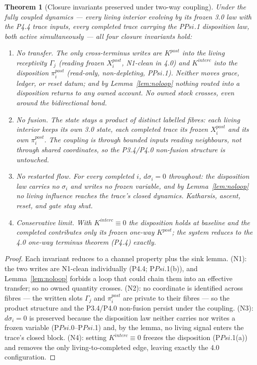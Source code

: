 \documentclass[11pt,a4paper]{article}
\def\Psi{Psi}%
\def\mathrm#1{#1}%
\def\emph#1{#1}%
\theoremstyle{definition}
\theoremstyle{plain}
\newtheorem{theorem}[definition]{Theorem}
\theoremstyle{remark}
\begin{document}
\begin{theorem}[Closure invariants preserved under two-way coupling]\label{thm:psipreserve}
Under the fully coupled dynamics --- every living interior evolving by its frozen 3.0 law with
the P4.4 trace inputs, every completed trace carrying the P$\Psi$.1 disposition law, both
active simultaneously --- all four closure invariants hold:
\begin{enumerate}[label=\textup{(N\arabic*)},leftmargin=1.2cm]
\item \emph{No transfer.} The only cross-terminus writes are \(K^{\mathrm{post}}\) into the
living receptivity \(\Gamma_j\) (reading frozen \(X_i^{\mathrm{post}}\), N1-clean in 4.0) and
\(K^{\mathrm{interc}}\) into the disposition \(\pi_i^{\mathrm{post}}\) (read-only, non-depleting,
P$\Psi$.1). Neither moves grace, ledger, or reset datum; and by Lemma~\ref{lem:noloop} nothing
routed into a disposition returns to any owned account. No owned stock crosses, even around the
bidirectional bond.
\item \emph{No fusion.} The state stays a product of distinct labelled fibres: each living
interior keeps its own 3.0 state, each completed trace its frozen \(X_i^{\mathrm{post}}\) and
its own \(\pi_i^{\mathrm{post}}\). The coupling is through bounded inputs reading neighbours,
not through shared coordinates, so the P3.4/P4.0 non-fusion structure is untouched.
\item \emph{No restarted flow.} For every completed \(i\), \(d\sigma_i=0\) throughout: the
disposition law carries no \(\sigma_i\) and writes no frozen variable, and by
Lemma~\ref{lem:noloop} no living influence reaches the trace's closed dynamics. Katharsis,
ascent, reset, and gate stay shut.
\item \emph{Conservative limit.} With \(K^{\mathrm{interc}}\equiv0\) the disposition holds at
baseline and the completed contributes only its frozen one-way \(K^{\mathrm{post}}\); the system
reduces to the 4.0 one-way terminus theorem (P4.4) exactly.
\end{enumerate}
\end{theorem}

\begin{proof}
Each invariant reduces to a channel property plus the sink lemma. (N1): the two writes are
N1-clean individually (P4.4; P$\Psi$.1(b)), and Lemma~\ref{lem:noloop} forbids a loop that
could chain them into an effective transfer; so no owned quantity crosses. (N2): no coordinate
is identified across fibres --- the written slots \(\Gamma_j\) and \(\pi_i^{\mathrm{post}}\) are
private to their fibres --- so the product structure and the P3.4/P4.0 non-fusion persist under
the coupling. (N3): \(d\sigma_i=0\) is preserved because the disposition law neither carries nor
writes a frozen variable (P$\Psi$.0--P$\Psi$.1) and, by the lemma, no living signal enters the
trace's closed block. (N4): setting \(K^{\mathrm{interc}}\equiv0\) freezes the disposition
(P$\Psi$.1(a)) and removes the only living-to-completed edge, leaving exactly the 4.0
configuration. \qedhere
\end{proof}
\end{document}
